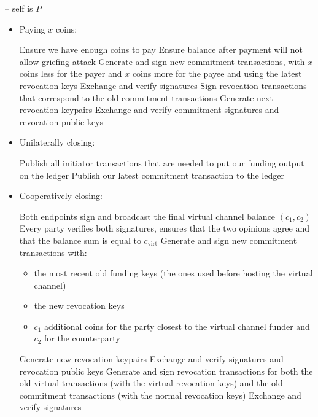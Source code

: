 \begin{center}
\begin{processbox}{\pchan -- self is $P$}
\begin{itemize}
      \item Paying $x$ coins:
      \begin{algorithmic}[0]
        \State Ensure we have enough coins to pay
          \State Ensure balance after payment will not allow griefing attack
        \EndIf
        \State Generate and sign new commitment transactions, with $x$ coins
        less for the payer and $x$ coins more for the payee and using the latest
        revocation keys
        \State Exchange and verify signatures
        \State Sign revocation transactions that correspond to the old
        commitment transactions
        \State Generate next revocation keypairs
        \State Exchange and verify commitment signatures and revocation public
        keys
      \end{algorithmic}

      \item Unilaterally closing:
      \begin{algorithmic}[0]
        \State Publish all initiator transactions that are needed to put our
        funding output on the ledger
        \State Publish our latest commitment transaction to the ledger
      \end{algorithmic}

      \item Cooperatively closing:
      \begin{algorithmic}[0]
        \State {}
        \State Both endpoints sign and broadcast the final virtual channel
        balance $(c_1, c_2)$
        \State Every party verifies both signatures, ensures that the two
        opinions agree and that the balance sum is equal to $c_{\mathrm{virt}}$
        \State Generate and sign new commitment transactions with:
        \begin{itemize}
          \item the most recent old funding keys (the ones used before hosting
          the virtual channel)
          \item the new revocation keys
          \item $c_1$ additional coins for the party closest to the virtual
          channel funder and $c_2$ for the counterparty
        \end{itemize}
        \State Generate new revocation keypairs
        \State Exchange and verify signatures and revocation public keys
        \State Generate and sign revocation transactions for both the old
        virtual transactions (with the virtual revocation keys) and the old
        commitment transactions (with the normal revocation keys)
        \State Exchange and verify signatures 
      \end{algorithmic}


\end{itemize}
\end{processbox}
\end{center}
